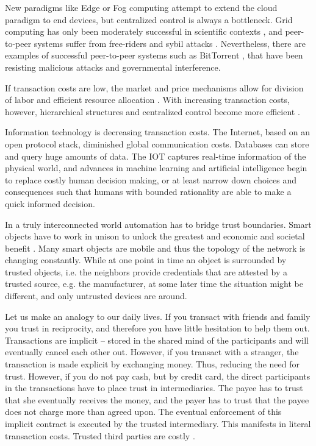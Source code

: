 New paradigms like Edge or Fog computing \parencite{Bonomi:2012:FCR:2342509.2342513,Yi:2015:SFC:2757384.2757397} attempt to extend the cloud paradigm to end devices, but centralized control is always a bottleneck. Grid computing has only been moderately successful in scientific contexts \parencite{Anderson:2002:SEP:581571.581573,Beberg2009Folding}, and peer-to-peer systems \parencite{Rodrigues:2010:PS:1831407.1831427} suffer from free-riders \parencite{10.2307/3003400} and sybil attacks \parencite{douceur2002sybil}. Nevertheless, there are examples of successful peer-to-peer systems such as BitTorrent \parencite{cohen2003incentives}, that have been resisting malicious attacks and governmental interference.

If transaction costs are low, the market and price mechanisms allow for division of labor and efficient resource allocation \parencite{smith1887inquiry}. With increasing transaction costs, however, hierarchical structures and centralized control become more efficient \parencite{ECCA:ECCA386}. 

Information technology is decreasing transaction costs. The Internet, based on an open protocol stack, diminished global communication costs. Databases can store and query huge amounts of data. The \ac{IOT} captures real-time information of the physical world, and advances in machine learning and artificial intelligence begin to replace costly human decision making, or at least narrow down choices and consequences such that humans with bounded rationality \parencite{simon1982models} are able to make a quick informed decision. 

In a truly interconnected world automation has to bridge trust boundaries. Smart objects have to work in unison to unlock the greatest and economic and societal benefit \parencite{manyika2015unlocking}.
Many smart objects are mobile and thus the topology of the network is changing constantly. While at one point in time an object is surrounded by trusted objects, i.e. the neighbors provide credentials that are attested by a trusted source, e.g. the manufacturer, at some later time the situation might be different, and only untrusted devices are around. 

Let us make an analogy to our daily lives. If you transact with friends and family you trust in reciprocity, and therefore you have little hesitation to help them out. Transactions are implicit -- stored in the shared mind of the participants and will eventually cancel each other out. However, if you transact with a stranger, the transaction is made explicit by exchanging money. Thus, reducing the need for trust. However, if you do not pay cash, but by credit card, the direct participants in the transactions have to place trust in intermediaries. The payee has to trust that she eventually receives the money, and the payer has to trust that the payee does not charge more than agreed upon. The eventual enforcement of this implicit contract is executed by the trusted intermediary. This manifests in literal transaction costs. Trusted third parties are costly \parencite{szabo2005trusted}.

